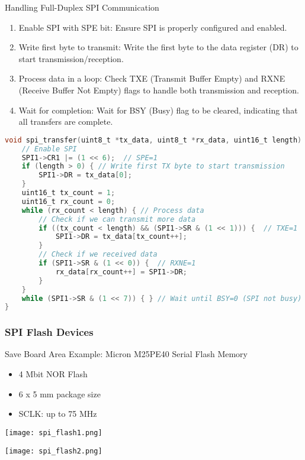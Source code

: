 \begin{KR}{Handling Full-Duplex SPI Communication}
    \begin{enumerate}
        \item Enable SPI with SPE bit: Ensure SPI is properly configured and enabled.
        \item Write first byte to transmit: Write the first byte to the data register (DR) to start transmission/reception.
        \item Process data in a loop: Check TXE (Transmit Buffer Empty) and RXNE (Receive Buffer Not Empty) flags to handle both transmission and reception.
        \item Wait for completion: Wait for BSY (Busy) flag to be cleared, indicating that all transfers are complete.
    \end{enumerate}

\begin{lstlisting}[language=C, style=basesmol]
void spi_transfer(uint8_t *tx_data, uint8_t *rx_data, uint16_t length) {
    // Enable SPI
    SPI1->CR1 |= (1 << 6);  // SPE=1
    if (length > 0) { // Write first TX byte to start transmission
        SPI1->DR = tx_data[0];
    }
    uint16_t tx_count = 1;
    uint16_t rx_count = 0;
    while (rx_count < length) { // Process data
        // Check if we can transmit more data
        if ((tx_count < length) && (SPI1->SR & (1 << 1))) {  // TXE=1
            SPI1->DR = tx_data[tx_count++];
        }
        // Check if we received data
        if (SPI1->SR & (1 << 0)) {  // RXNE=1
            rx_data[rx_count++] = SPI1->DR;
        }
    }
    while (SPI1->SR & (1 << 7)) { } // Wait until BSY=0 (SPI not busy)
}
\end{lstlisting}
\end{KR}

\subsubsection{SPI Flash Devices} 

\begin{definition}{Save Board Area}
    Example: Micron M25PE40 Serial Flash Memory
    \begin{itemize}
        \item 4 Mbit NOR Flash
        \item 6 x 5 mm package size
        \item SCLK: up to 75 MHz
    \end{itemize}

    \begin{minipage}{0.5\linewidth}
        \texttt{[image: spi\_flash1.png]}
    \end{minipage}
    \begin{minipage}{0.5\linewidth}
        \texttt{[image: spi\_flash2.png]}
    \end{minipage}
\end{definition}


    